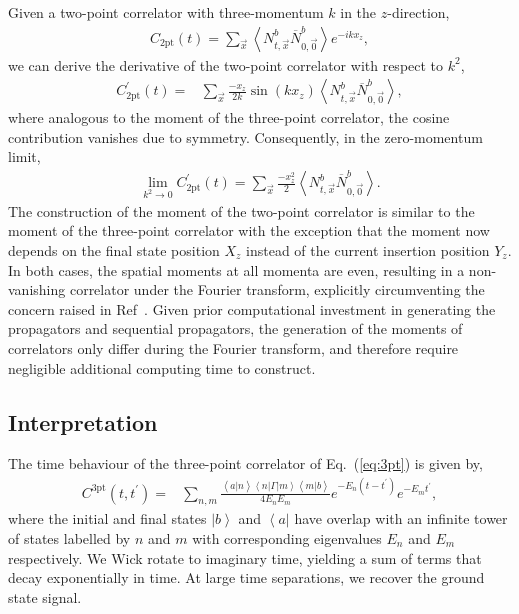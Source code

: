 \documentclass{PoS}
\begin{document}
Given a two-point correlator with three-momentum $k$ in the $z$-direction,
\begin{align}
C_{\text{2pt}}(t) = \sum_{\vec{x}} \left< N^b_{t,\vec{x}}\overline{N}^b_{0,\vec{0}}\right> e^{-ikx_z},
\label{eq:2pt}
\end{align}
we can derive the derivative of the two-point correlator with respect to $k^2$,
\begin{align}
C^\prime_{\text{2pt}}(t)
= & \sum_{\vec{x}}\frac{-x_z}{2k} \sin\left(kx_z\right) \left<N^b_{t, \vec{x}}\overline{N}^b_{0,\vec{0}} \right> ,
\label{eq:2ptmoment}
\end{align}
where analogous to the moment of the three-point correlator, the cosine contribution vanishes due to symmetry.  Consequently, in the zero-momentum limit,
\begin{align}
\lim_{k^2\rightarrow 0 } C^\prime_{\text{2pt}}(t) = \sum_{\vec{x}} \frac{-x_z^2}{2}\left<N^b_{t, \vec{x}}\overline{N}^b_{0,\vec{0}} \right>.
\label{eq:2ptmoment0}
\end{align}
The construction of the moment of the two-point correlator is similar to the moment of the three-point correlator with the exception that the moment now depends on the final state position $X_z$ instead of the current insertion position $Y_z$. In both cases, the spatial moments at all momenta are even, resulting in a non-vanishing correlator under the Fourier transform, explicitly circumventing the concern raised in Ref~\cite{Wilcox:2002zt}.  Given prior computational investment in generating the propagators and sequential propagators, the generation of the moments of correlators only differ during the Fourier transform, and therefore require negligible additional computing time to construct.

\subsection{Interpretation}
The time behaviour of the three-point correlator of Eq.~(\ref{eq:3pt}) is given by,
\begin{align}
C^{\text{3pt}}(t, t^\prime)  = & \sum_{n,m} \frac{\left<a | n\right>\left<n| \Gamma |m\right>\left<m | b\right>}{4E_n E_m} e^{-E_n(t - t^\prime)} e^{-E_m t^\prime} \label{eq:3ptfit},
\end{align}
where the initial and final states $\left|b\right>$ and $\left<a\right|$ have overlap with an infinite tower of states labelled by $n$ and $m$ with corresponding eigenvalues $E_n$ and $E_m$ respectively. We Wick rotate to imaginary time, yielding a sum of terms that decay exponentially in time. At large time separations, we recover the ground state signal.
\end{document}
